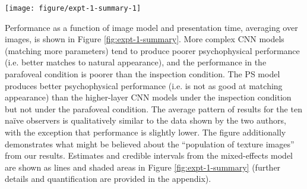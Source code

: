 \documentclass[doc, 11pt,a4paper,natbib]{apa6}\usepackage[]{graphicx}\usepackage[]{color}
\makeatletter
\def\maxwidth{ %
  \ifdim\Gin@nat@width>\linewidth
    \linewidth
  \else
    \Gin@nat@width
  \fi
}
\newenvironment{knitrout}{}{} %
\makeatother
\begin{document}
\begin{knitrout}
\color{fgcolor}\begin{figure*}
\texttt{[image: figure/expt-1-summary-1]} \caption[Performance as a function of image model in Experiment 1, averaging over images]{Performance as a function of image model in Experiment 1, averaging over images. 
              For the authors (CF and TW), points show the mean proportion correct and error bars show 95\% bootstrapped confidence intervals. Each data point represents 300 trials. 
Solid lines show mixed-effects model predictions for this observer (mean of posterior regression line), ignoring random effects of image.
For naive observers (right panel, N = 10), points show grand mean and 95\% bootstrapped confidence intervals based on individual observer means; lines represent mixed-effects model predictions and uncertainty for the population fixed effects, ignoring random effects of observer and image.
The dashed horizontal lines in all panels show chance performance.
Shaded regions in all panels show 95\% credible intervals for the given model. 
Note these are independent, and so overestimate the uncertainty for making any pairwise comparison between conditions (see appendix for details).
}\label{fig:expt-1-summary}
\end{figure*}


\end{knitrout}

Performance as a function of image model and presentation time, averaging over images, is shown in Figure \ref{fig:expt-1-summary}.
More complex CNN models (matching more parameters) tend to produce poorer psychophysical performance (i.e. better matches to natural appearance), and the performance in the parafoveal condition is poorer than the inspection condition.
The PS model produces better psychophysical performance (i.e. is not as good at matching appearance) than the higher-layer CNN models under the inspection condition but not under the parafoveal condition.
The average pattern of results for the ten na\"{i}ve observers is qualitatively similar to the data shown by the two authors, with the exception that performance is slightly lower.
The figure additionally demonstrates what might be believed about the ``population of texture images'' from our results.
Estimates and credible intervals from the mixed-effects model are shown as lines and shaded areas in Figure \ref{fig:expt-1-summary} (further details and quantification are provided in the appendix).
\end{document}
